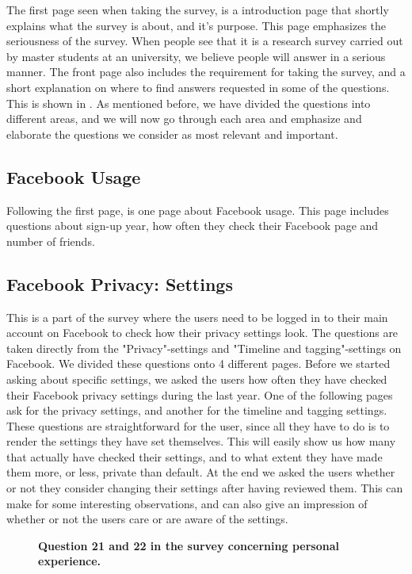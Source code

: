The first page seen when taking the survey, is a introduction page that shortly explains what the survey is about, and it's purpose. This page emphasizes the seriousness of the survey. When people see that it is a research survey carried out by master students at an university, we believe people will answer in a serious manner. The front page also includes the requirement for taking the survey, and a short explanation on where to find answers requested in some of the questions. This is shown in . As mentioned before, we have divided the questions into different areas, and we will now go through each area and emphasize and elaborate the questions we consider as most relevant and important. 
 

\subsection{Facebook Usage}
Following the first page, is one page about Facebook usage. This page includes questions about sign-up year, how often they check their Facebook page and number of friends. 

\subsection{Facebook Privacy: Settings}
This is a part of the survey where the users need to be logged in to their main account on Facebook to check how their privacy settings look. The questions are taken directly from the "Privacy"-settings and "Timeline and tagging"-settings on Facebook. We divided these questions onto 4 different pages. Before we started asking about specific settings, we asked the users how often they have checked their Facebook privacy settings during the last year.  One of the following pages ask for the privacy settings, and another for the timeline and tagging settings. These questions are straightforward for the user, since all they have to do is to render the settings they have set themselves. This will easily show us how many that actually have checked their settings, and to what extent they have made them more, or less, private than default. At the end we asked the users whether or not they consider changing their settings after having reviewed them. This can make for some interesting observations, and can also give an impression of whether or not the users care or are aware of the settings. 

\begin{figure}[t]
\centering
{}
\caption[Question 21 and 22 in the survey concerning personal experience]{\textbf{Question 21 and 22 in the survey concerning personal experience.}} 
\label{fig:page12}
\end{figure}

